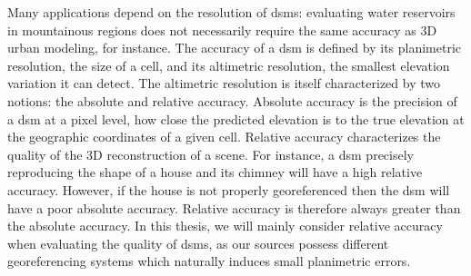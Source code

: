 Many applications depend on the resolution of \acrshort{dsm}s: evaluating water reservoirs in mountainous regions does not necessarily require the same accuracy as 3D urban modeling, for instance. The accuracy of a \acrshort{dsm} is defined by its planimetric resolution, \ie the size of a cell, and its altimetric resolution, \ie the smallest elevation variation it can detect. The altimetric resolution is itself characterized by two notions: the absolute and relative accuracy. Absolute accuracy is the precision of a \acrshort{dsm} at a pixel level, \ie how close the predicted elevation is to the true elevation at the geographic coordinates of a given cell. Relative accuracy characterizes the quality of the 3D reconstruction of a scene. For instance, a \acrshort{dsm} precisely reproducing the shape of a house and its chimney will have a high relative accuracy. However, if the house is not properly georeferenced then the \acrshort{dsm} will have a poor absolute accuracy. Relative accuracy is therefore always greater than the absolute accuracy. In this thesis, we will mainly consider relative accuracy when evaluating the quality of \acrshort{dsm}s, as our sources possess different georeferencing systems which naturally induces small planimetric errors. 

